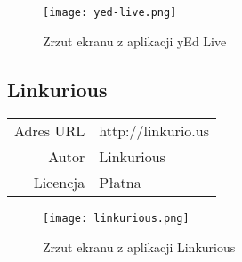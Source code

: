 \begin{figure}[H]
\caption{Zrzut ekranu z aplikacji yEd Live}
\centering
\texttt{[image: yed-live.png]}
\end{figure}


\subsection*{Linkurious}
\bigskip
\noindent\begin{tabularx}{\textwidth}{r|X|}
\cline{2-2}
  Adres URL & http://linkurio.us \\ 
\cline{2-2} 
 Autor & Linkurious\\ 
\cline{2-2}
 Licencja & Płatna\\ 
\cline{2-2}
\end{tabularx}
\bigskip

\begin{figure}[H]
\caption{Zrzut ekranu z aplikacji Linkurious}
\centering
\texttt{[image: linkurious.png]}
\end{figure}

